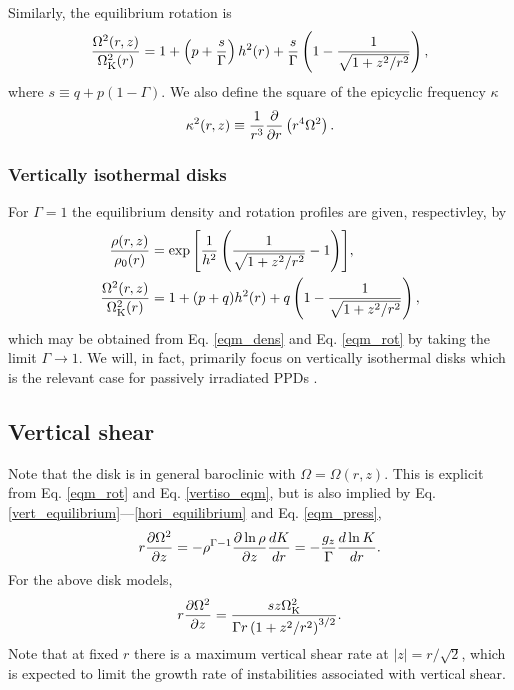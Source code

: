 Similarly, the equilibrium rotation is 
\begin{align}\label{eqm_rot}
  \frac{\Omega^2(r,z)}{\Omega_{\rm K}^2(r)}=1 +
  \left(p+\frac{s}{\Gamma}\right) h^2(r) 
  +\frac{s}{\Gamma} \left(1-\frac{1}{\sqrt{1+z^2/r^2}}\right), 
\end{align}
where $s\equiv q+p(1-\Gamma)$. We also define %
the square of the epicyclic frequency $\kappa$ 
\begin{align}
  \kappa^2(r,z) \equiv \frac{1}{r^3}\frac{\p }{\p
    r}\left(r^4\Omega^2\right). %
\end{align}


\subsubsection{Vertically isothermal disks}
For $\Gamma=1$ the equilibrium density and rotation profiles are
given, respectivley, by 
\begin{align}
  \frac{\rho(r,z)}{\rho_0(r)} &=
  \exp{\left[\frac{1}{ h^2}\left(\frac{1}{\sqrt{1+z^2/r^2}}-1\right)\right]},\\    
  \frac{\Omega^2(r,z)}{\Omega_{\rm K}^2(r)}& =1+ (p+q) h^2(r) + q\left(1 -
    \frac{1}{\sqrt{1+z^2/r^2}}\right),\label{vertiso_eqm}
\end{align}
which may be obtained from Eq. \ref{eqm_dens} and Eq. \ref{eqm_rot} by
taking the limit $\Gamma\to 1$. We will, in fact, primarily focus on
vertically isothermal disks which is the relevant case for passively irradiated
PPDs \citep{chiang97}. 


\subsection{Vertical shear}\label{vshear_def}
Note that the disk is in general baroclinic with $\Omega =
\Omega(r,z)$. This is explicit from Eq. \ref{eqm_rot} and Eq. \ref{vertiso_eqm}, but is also 
implied by Eq. \ref{vert_equilibrium}---\ref{hori_equilibrium} and 
Eq. \ref{eqm_press},  
\begin{align}
  r\frac{\partial\Omega^2}{\partial z} = - \rho^{\Gamma-1}\frac{\partial\ln\rho}{\partial
    z}\frac{dK}{dr} = - \frac{g_z}{\Gamma}\frac{d\ln K}{dr}.\label{vertical_shear}
\end{align}
For the above disk models,
\begin{align}
  r\frac{\partial\Omega^2}{\partial z} = \frac{sz\Omega_{\rm K}^2}{\Gamma
    r\left(1+z^2/r^2\right)^{3/2}}. \label{vertical_shear_ex} 
\end{align}
Note that at fixed $r$ there is a maximum vertical shear rate at $|z|=r/\sqrt{2}$,
which is expected to limit the growth rate of instabilities associated with vertical shear. 

